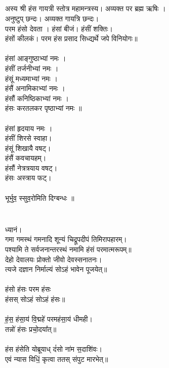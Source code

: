 \subsection{}
अस्य श्री हंस गायत्री स्तोत्र महामन्त्रस्य। अव्यक्त पर ब्रह्म ऋषिः ।\\
{\small अनुष्टुप् छन्दः।} अव्यक्त गायत्रि छन्दः। \\
परम हंसो देवता । हंसां बीजं। हंसीं शक्तिः।\\
हंसों कीलकं। परम हंस प्रसाद सिध्द्यर्थे जपे विनियोगः॥\\
\\
हंसां आङ्गुष्ठाभ्यां नमः ।\\
हंसीं तर्जनीभ्यां नमः ।\\
हंसूं मध्यमाभ्यां नमः ।\\
हंसैं अनामिकाभ्यां नमः ।\\
हंसौं कनिष्ठिकाभ्यां नमः ।\\
हंसः करतलकर पृष्ठाभ्यां नमः ॥\\
\\
हंसां हृदयाय नमः ।\\
हंसीं शिरसे स्वाहा।\\
हंसूं शिखायै वषट्।\\
हंसैं कवचायहम्।\\
हंसौं नेत्रत्रयाय वषट्।\\
हंसः अस्त्राय फट्।\\
\\
भूर्भुव॒ स्सुव॒रोमिति दिग्बन्धः ॥\\
\\
\subsubsection{}
ध्यानं।\\
गमा गमस्थं गमनादि शून्यं चिद्रूपदीपं तिमिरापहारम्।\\
पश्यामि ते सर्वजनान्तरस्थं नमामि हंसं परमात्मरूपम्॥\\
देहो देवालयः प्रोक्तो जीवो देवस्सनातनः।\\
त्यजे दज्ञान निर्माल्यं सोऽहं भावेन पूजयेत्॥\\
\\
हंसो हंसः परम हंसः  \\
हंसस् सोऽहं सोऽहं हंसः॥\\
\\
हं॒स॒ हंसा॒य॑ वि॒द्महे॑ परमहंसा॒य॑ धीमही।\\
तन्नो॑ हंसः प्रचो॒दया᳚त्॥\\
\\
हंस हंसेति योब्रूयाध् दं॑सो ना॑म स॒दाशि॑वः।\\
एवं न्यास विधिं॒ कृत्वा ततस् संपुट मारभेत्॥\\
